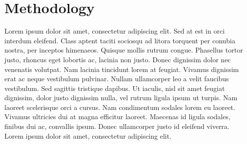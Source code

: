 \section{Methodology}\label{methodology}

Lorem ipsum dolor sit amet, consectetur adipiscing elit. Sed at est in
orci interdum eleifend. Class aptent taciti sociosqu ad litora torquent
per conubia nostra, per inceptos himenaeos. Quisque mollis rutrum
congue. Phasellus tortor justo, rhoncus eget lobortis ac, lacinia non
justo. Donec dignissim dolor nec venenatis volutpat. Nam lacinia
tincidunt lorem at feugiat. Vivamus dignissim erat ac neque vestibulum
pulvinar. Nullam ullamcorper leo a velit faucibus vestibulum. Sed
sagittis tristique dapibus. Ut iaculis, nisl sit amet feugiat dignissim,
dolor justo dignissim nulla, vel rutrum ligula ipsum ut turpis. Nam
laoreet scelerisque orci a cursus. Nam condimentum sodales lorem eu
laoreet. Vivamus ultricies dui at magna efficitur laoreet. Maecenas id
ligula sodales, finibus dui ac, convallis ipsum. Donec ullamcorper justo
id eleifend viverra. Lorem ipsum dolor sit amet, consectetur adipiscing
elit.
